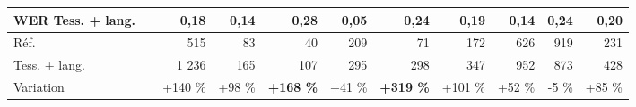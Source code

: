 {\begin{tabular}{|l|ccc|ccc|ccc|}
  WER Tess. + lang.\ \ &
  \multicolumn{1}{r|}{0,18 }&
  \multicolumn{1}{r|}{0,14} &
  \multicolumn{1}{r|}{\textbf{0,28}} &
  \multicolumn{1}{r|}{0,05} &
   \multicolumn{1}{r|}{\textbf{0,24}} &
  \multicolumn{1}{r|}{0,19} &
  \multicolumn{1}{r|}{0,14} &
  \multicolumn{1}{r|}{0,24}&
  \multicolumn{1}{r|}{0,20} 
   \\ \hline
   \hline
Réf.\ &
    \multicolumn{1}{r|}{515}&
  \multicolumn{1}{r|}{83} &
  \multicolumn{1}{r|}{40} &
  \multicolumn{1}{r|}{209} &
  \multicolumn{1}{r|}{71} &
  \multicolumn{1}{r|}{172} &
  \multicolumn{1}{r|}{626} &
  \multicolumn{1}{r|}{919}&
  \multicolumn{1}{r|}{231} 
   \\ \hline
Tess. + lang.\ &
    \multicolumn{1}{r|}{1 236} &
  \multicolumn{1}{r|}{165} &
  \multicolumn{1}{r|}{107} &
  \multicolumn{1}{r|}{295} &
  \multicolumn{1}{r|}{298} &
  \multicolumn{1}{r|}{347} &
  \multicolumn{1}{r|}{952} &
  \multicolumn{1}{r|}{873}&
  \multicolumn{1}{r|}{428} 
   \\ \hline
Variation & \multicolumn{1}{r|}{+140 \%}&
\multicolumn{1}{r|}{+98 \%}&
\multicolumn{1}{r|}{\textbf{+168 \%}}&
\multicolumn{1}{r|}{+41 \%}&
\multicolumn{1}{r|}{\textbf{+319 \%}}&
\multicolumn{1}{r|}{+101 \%}&
\multicolumn{1}{r|}{+52 \%}&
\multicolumn{1}{r|}{-5 \%}&
\multicolumn{1}{r|}{+85 \%}\\
 \hline
\end{tabular}
}